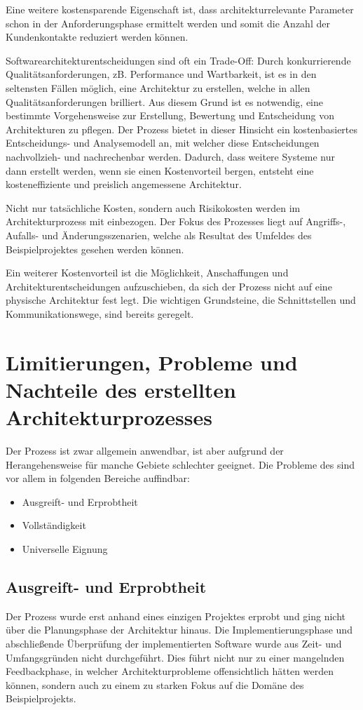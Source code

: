 Eine weitere kostensparende Eigenschaft ist, dass architekturrelevante Parameter schon in der Anforderungsphase ermittelt werden und somit die Anzahl der Kundenkontakte reduziert werden können.

Softwarearchitekturentscheidungen sind oft ein Trade-Off: Durch konkurrierende Qualitätsanforderungen, zB. Performance und Wartbarkeit, ist es in den seltensten Fällen möglich, eine Architektur zu erstellen, welche in allen Qualitätsanforderungen brilliert. Aus diesem Grund ist es notwendig, eine bestimmte Vorgehensweise zur Erstellung, Bewertung und Entscheidung von Architekturen zu pflegen. Der Prozess bietet in dieser Hinsicht ein kostenbasiertes Entscheidungs- und Analysemodell an, mit welcher diese Entscheidungen nachvollzieh- und nachrechenbar werden. Dadurch, dass weitere Systeme nur dann erstellt werden, wenn sie einen Kostenvorteil bergen, entsteht eine kosteneffiziente und preislich angemessene Architektur.

Nicht nur tatsächliche Kosten, sondern auch Risikokosten werden im Architekturprozess mit einbezogen. Der Fokus des Prozesses liegt auf Angriffs-, Aufalls- und Änderungsszenarien, welche als Resultat des Umfeldes des Beispielprojektes gesehen werden können.

Ein weiterer Kostenvorteil ist die Möglichkeit, Anschaffungen und Architekturentscheidungen aufzuschieben, da sich der Prozess nicht auf eine physische Architektur fest legt. Die wichtigen Grundsteine, die Schnittstellen und Kommunikationswege, sind bereits geregelt.


\section{Limitierungen, Probleme und Nachteile des erstellten Architekturprozesses}
Der Prozess ist zwar allgemein anwendbar, ist aber aufgrund der Herangehensweise für manche Gebiete schlechter geeignet. Die Probleme des sind vor allem in folgenden Bereiche auffindbar:

\begin{itemize}
  \item Ausgreift- und Erprobtheit
  \item Vollständigkeit
  \item Universelle Eignung
\end{itemize}

\subsection{Ausgreift- und Erprobtheit}
Der Prozess wurde erst anhand eines einzigen Projektes erprobt und ging nicht über die Planungsphase der Architektur hinaus. Die Implementierungsphase und abschließende Überprüfung der implementierten Software wurde aus Zeit- und Umfangsgründen nicht durchgeführt. Dies führt nicht nur zu einer mangelnden Feedbackphase, in welcher Architekturprobleme offensichtlich hätten werden können, sondern auch zu einem zu starken Fokus auf die Domäne des Beispielprojekts.

